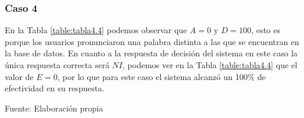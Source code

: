 \subsubsection{Caso 4}
En la Tabla \ref{table:tabla4.4} podemos observar que $A = 0$ y $D = 100$, esto es porque los usuarios pronunciaron una palabra distinta a las que se encuentran en la base de datos.
\vskip 0.5cm
En cuanto a la respuesta de decisión del sistema en este caso la única respuesta correcta será $NI$, podemos ver en la Tabla \ref{table:tabla4.4} que el valor de $E = 0$, por lo que para este caso el sistema alcanzó un 100\% de efectividad en su respuesta.

\begin{center}
\begin{table}[H]
\centering
\caption{\small{Resultados para obtener U2 en el caso 4.}}
\label{table:tabla4.4}
\vskip 0.2cm
\begin{center}
\vskip 0.2cm
{\small{Fuente: Elaboración propia}}
\end{center}
\end{table}
\end{center}

